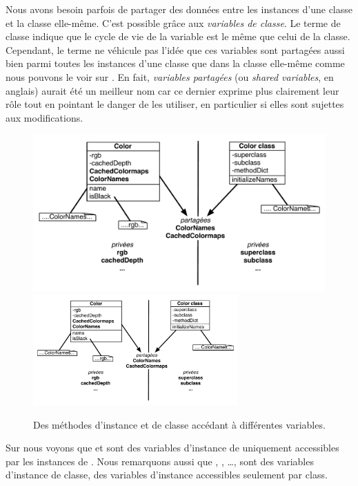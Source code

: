 \documentclass[a4paper,10pt,twoside]{book}
\begin{document}
Nous avons besoin parfois de partager des données entre les instances d'une classe et la classe elle-même.
C'est possible grâce aux \emph{variables de classe}. 
Le terme  de classe indique que le cycle de vie
de la variable est le même que celui de la classe. Cependant, 
le terme ne véhicule pas l'idée que ces variables sont partagées aussi bien parmi toutes
les instances d'une classe que dans la classe elle-même comme nous pouvons le voir sur .
En fait, \emph{variables partagées} (ou \emph{shared variables}, en anglais) aurait
été un meilleur nom car ce dernier exprime plus clairement leur rôle
tout en pointant le danger de les utiliser, en particulier si elles sont 
sujettes aux modifications.

\begin{figure}[htb]
\begin{center}
\ifluluelse
	{\includegraphics[width=\textwidth]{privateSharedVarColor}}
	{\includegraphics[width=0.7\textwidth]{privateSharedVarColor}}
\caption{Des méthodes d'instance et de classe accédant à différentes
variables.}
\end{center}
\end{figure}

Sur  nous voyons que  et  sont
des variables d'instance de  uniquement accessibles par les 
instances de .
Nous remarquons aussi que , , \ldots \etc, sont des variables d'instance de classe, \ie des variables d'instance  accessibles seulement par  class.
\end{document}
